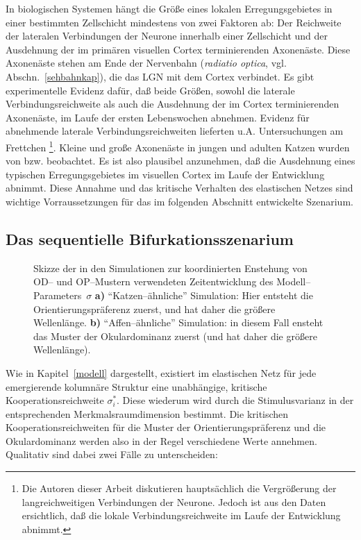 In biologischen Systemen hängt die Größe eines lokalen Erregungsgebietes
in einer bestimmten Zellschicht mindestens von zwei Faktoren ab: Der
Reichweite der lateralen Verbindungen der Neurone innerhalb einer
Zellschicht und der Ausdehnung der im primären visuellen Cortex
terminierenden Axonenäste.  Diese Axonenäste stehen am Ende der
Nervenbahn (\emph{radiatio optica}, vgl. Abschn.~\ref{sehbahnkap}), die das
LGN mit dem Cortex verbindet.  Es gibt experimentelle Evidenz dafür, daß
beide Größen, sowohl die laterale Verbindungsreichweite als auch die
Ausdehnung der im Cortex terminierenden Axonenäste, im Laufe der ersten
Lebenswochen abnehmen. Evidenz für abnehmende laterale
Verbindungsreichweiten lieferten u.A. Untersuchungen am Frettchen
\cite{katz:1994}\footnote{Die Autoren dieser Arbeit diskutieren hauptsächlich
die Vergrößerung der langreichweitigen Verbindungen der Neurone. Jedoch
ist aus den Daten ersichtlich, daß die lokale Verbindungsreichweite im
Laufe der Entwicklung abnimmt.}. Kleine und große Axonenäste in jungen und
adulten Katzen wurden von 
bzw.  beobachtet.  Es ist also plausibel anzunehmen,
daß die Ausdehnung eines typischen Erregungsgebietes im visuellen Cortex
im Laufe der Entwicklung abnimmt. Diese Annahme und das kritische Verhalten
des elastischen Netzes sind wichtige Vorraussetzungen für das im folgenden
Abschnitt entwickelte Szenarium.
\setcounter{footnote}{1}

\subsection{Das sequentielle Bifurkationsszenarium}

\begin{figure}[t]
\begin{center}
\caption{Skizze der in den Simulationen zur koordinierten Enstehung von
OD-- und OP--Mustern verwendeten Zeitentwicklung des
Modell--Parameters~$\sigma$ \textbf{a)} ``Katzen--ähnliche'' Simulation:
Hier entsteht die Orientierungspräferenz zuerst, und hat daher die
größere Wellenlänge. \textbf{b)} ``Affen--ähnliche'' Simulation: in
diesem Fall ensteht das Muster der Okulardominanz zuerst (und hat daher die
größere Wellenlänge).}
\label{zeitentwicklung}
\end{center}
\end{figure}

Wie in Kapitel~\ref{modell} dargestellt, existiert im elastischen Netz für
jede emergierende kolumnäre Struktur eine unabhängige, kritische
Kooperationsreichweite $\sigma_i^\ast$.  Diese wiederum wird durch die
Stimulusvarianz  in der entsprechenden Merkmalsraumdimension bestimmt. Die
kritischen Kooperationsreichweiten für die Muster der
Orientierungspräferenz und die Okulardominanz werden also in der Regel
verschiedene Werte annehmen. Qualitativ sind dabei zwei Fälle zu
unterscheiden:

